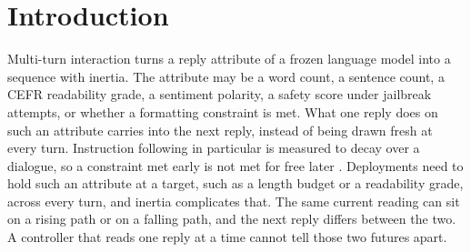 \section{Introduction}
\label{sec:intro}

Multi-turn interaction turns a reply attribute of a frozen language model into a sequence with inertia.
The attribute may be a word count, a sentence count, a CEFR readability grade, a sentiment polarity, a safety score under jailbreak attempts, or whether a formatting constraint is met.  %
What one reply does on such an attribute carries into the next reply, instead of being drawn fresh at every turn.
Instruction following in particular is measured to decay over a dialogue, so a constraint met early is not met for free later \citep{li2024instability}.
Deployments need to hold such an attribute at a target, such as a length budget or a readability grade, across every turn, and inertia complicates that.
The same current reading can sit on a rising path or on a falling path, and the next reply differs between the two.
A controller that reads one reply at a time cannot tell those two futures apart.


